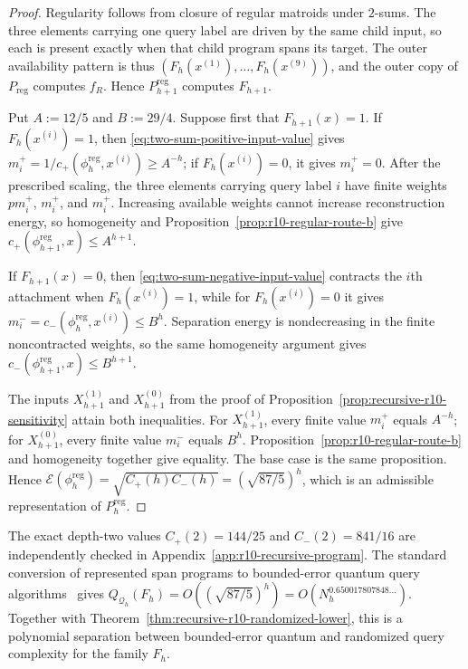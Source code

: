 \documentclass[11pt]{article}
\numberwithin{equation}{section}
\theoremstyle{remark}
\begin{document}
\begin{proof}
Regularity follows from closure of regular matroids under $2$-sums.  The
three elements carrying one query label are driven by the same child input,
so each is present exactly when that child program spans its target.
The outer availability pattern is thus
$(F_h(x^{(1)}),\ldots,F_h(x^{(9)}))$, and the outer copy of
$P_{\mathrm{reg}}$ computes $f_R$.  Hence $P_{h+1}^{\mathrm{reg}}$ computes
$F_{h+1}$.

Put $A:=12/5$ and $B:=29/4$. Suppose first that $F_{h+1}(x)=1$. If
$F_h(x^{(i)})=1$, then \eqref{eq:two-sum-positive-input-value} gives
$m_i^+=1/c_+(\phi_h^{\mathrm{reg}},x^{(i)})\geq A^{-h}$; if
$F_h(x^{(i)})=0$, it gives $m_i^+=0$. After the prescribed scaling, the three
elements carrying query label $i$ have finite weights $p m_i^+$, $m_i^+$,
and $m_i^+$. Increasing available weights cannot increase reconstruction
energy, so homogeneity and Proposition~\ref{prop:r10-regular-route-b} give
$c_+(\phi_{h+1}^{\mathrm{reg}},x)\leq A^{h+1}$.

If $F_{h+1}(x)=0$, then \eqref{eq:two-sum-negative-input-value} contracts the
$i$th attachment when $F_h(x^{(i)})=1$, while for $F_h(x^{(i)})=0$ it gives
$m_i^-=c_-(\phi_h^{\mathrm{reg}},x^{(i)})\leq B^h$. Separation energy is
nondecreasing in the finite noncontracted weights, so the same homogeneity
argument gives $c_-(\phi_{h+1}^{\mathrm{reg}},x)\leq B^{h+1}$.

The inputs $X_{h+1}^{(1)}$ and $X_{h+1}^{(0)}$ from the proof of
Proposition~\ref{prop:recursive-r10-sensitivity} attain both inequalities.
For $X_{h+1}^{(1)}$, every finite value $m_i^+$ equals $A^{-h}$; for
$X_{h+1}^{(0)}$, every finite value $m_i^-$ equals $B^h$.
Proposition~\ref{prop:r10-regular-route-b} and homogeneity together give
equality. The base case is the same proposition. Hence
$\mathcal E(\phi_h^{\mathrm{reg}})=\sqrt{C_+(h)C_-(h)}=(\sqrt{87/5})^h$,
which is an admissible representation of $P_h^{\mathrm{reg}}$.
\end{proof}

The exact depth-two values $C_+(2)=144/25$ and $C_-(2)=841/16$ are
independently checked in Appendix~\ref{app:r10-recursive-program}. The
standard conversion of represented span programs to bounded-error quantum
query algorithms~\cite{Reichardt2011,Reichardt2014Equivalent} gives
$Q_{\mathcal Q_h}(F_h)=O((\sqrt{87/5})^h)=O(N_h^{0.650017807848\ldots})$.
Together with Theorem~\ref{thm:recursive-r10-randomized-lower}, this is a
polynomial separation between bounded-error quantum and randomized query
complexity for the family $F_h$.
\end{document}
